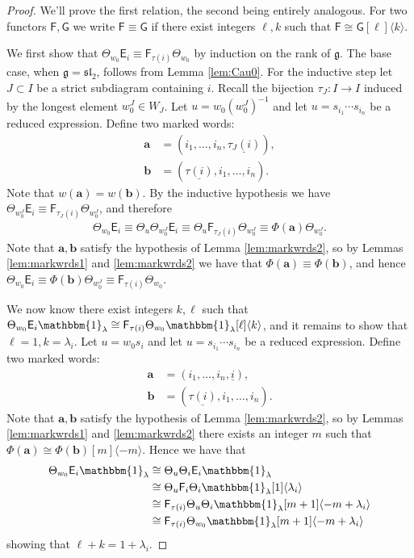 \documentclass[11pt,reqno]{amsart}
\numberwithin{equation}{section}
\theoremstyle{definition}
\theoremstyle{named}
\newcommand{\sE}{\mathsf{E}}
\newcommand{\sF}{\mathsf{F}}
\newcommand{\sG}{\mathsf{G}}
\newcommand{\ba}{\mathbf{a}}
\newcommand{\bb}{\mathbf{b}}
\newcommand{\fg}{\mathfrak{g}}
\newcommand{\ul}[1]{\underline{#1}}
\newcommand{\fsl}{\mathfrak{sl}}
\newcommand{\bone}{\mathbbm{1}}
\begin{document}
\begin{proof}
We'll prove the first relation, the second being entirely analogous.  
For two functors $\sF,\sG$ we write $\sF \equiv \sG$ if there exist integers $\ell,k$ such that $\sF \cong \sG[\ell]\langle k \rangle$.  

We first show that $\Theta_{w_0}\sE_i \equiv \sF_{\tau(i)}\Theta_{w_0}$ by induction on the rank of $\fg$.   The base case, when $\fg=\fsl_2$,  follows from Lemma \ref{lem:Cau0}.  For the inductive step let $J \subset I$ be a strict subdiagram containing $i$.  Recall the bijection $\tau_J:I\to I$ induced by the longest element $w_0^J \in W_J$.  Let $u=w_0(w_0^J)^{-1}$ and let $u=s_{i_1}\cdots s_{i_n}$ be a reduced expression.  Define two marked words:
\begin{align*}
\ba&=(i_1,\hdots,i_n,\ul{\tau_J(i)}),\\
\bb&=(\ul{\tau(i)},i_1,\hdots,i_n).
\end{align*}
Note that $w(\ba)=w(\bb)$.  By the inductive hypothesis we have $\Theta_{w_0^J}\sE_i 
\equiv  \sF_{\tau_J(i)}\Theta_{w_0^J}$, and therefore
\begin{align*}
\Theta_{w_0}\sE_i \equiv \Theta_u\Theta_{w_0^J}\sE_i 
\equiv  \Theta_u\sF_{\tau_J(i)}\Theta_{w_0^J} \equiv \Phi(\ba)\Theta_{w_0^J}.
\end{align*}
Note that $\ba,\bb$ satisfy the hypothesis of Lemma \ref{lem:markwrds2}, so by Lemmas \ref{lem:markwrds1} and \ref{lem:markwrds2}
we have that $\Phi(\ba)\equiv\Phi(\bb)$, and hence
$\Theta_{w_0}\sE_i \equiv \Phi(\bb)\Theta_{w_0^J} \equiv \sF_{\tau(i)}\Theta_{w_0}.$

We now know there exist integers $k,\ell$ such that $\Theta_{w_0}\sE_i\bone_\lambda \cong \sF_{\tau(i)}\Theta_{w_0}\bone_\lambda[\ell]\langle k \rangle$, and it remains to show that $\ell=1, k=\lambda_i$.  Let $u=w_0s_i$ and let $u=s_{i_1}\cdots s_{i_n}$ be a reduced expression.  Define two marked words:
\begin{align*}
\ba&=(i_1,\hdots,i_n,\ul{i}),\\
\bb&=(\ul{\tau(i)},i_1,\hdots,i_n).
\end{align*}
Note that $\ba,\bb$ satisfy the hypothesis of Lemma \ref{lem:markwrds2}, so by Lemmas \ref{lem:markwrds1} and \ref{lem:markwrds2} there exists an integer $m$ such that $\Phi(\ba)\cong \Phi(\bb)[m]\langle -m \rangle$.  Hence we have that
\begin{align*}
\Theta_{w_0} \sE_i \bone_\lambda &\cong \Theta_u \Theta_i \sE_i\bone_\lambda \\
& \cong \Theta_u \sF_i \Theta_i\bone_\lambda [1]\langle \lambda_i \rangle \\
& \cong \sF_{\tau(i)}\Theta_u \Theta_i \bone_\lambda[m+1]\langle -m+\lambda_i \rangle \\
& \cong \sF_{\tau(i)}\Theta_{w_0} \bone_\lambda[m+1]\langle -m+\lambda_i \rangle
\end{align*}
showing that $\ell+k=1+\lambda_i$.  


\end{proof}
\end{document}
